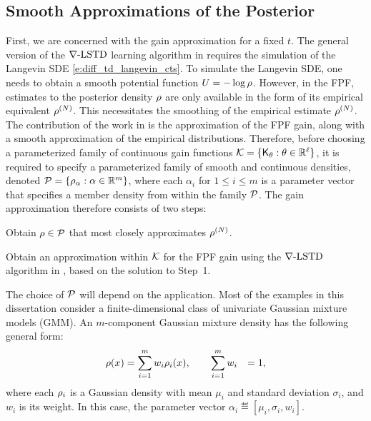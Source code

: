 \subsection{Smooth Approximations of the Posterior}
\label{s:fpf_em}
First, we are concerned with the gain approximation for a fixed $t$. The general version of the $\nabla\text{-LSTD}$ learning algorithm in  requires the simulation of the Langevin SDE \eqref{e:diff_td_langevin_cts}. To simulate the Langevin SDE, one needs to obtain a smooth potential function $U = -\log \rho$. However, in the FPF, estimates to the posterior density $\rho$ are only available in the form of its empirical equivalent $\rho^{(N)}$. This necessitates the smoothing of the empirical estimate $\rho^{(N)}$. The contribution of the work in \cite{raddevmey16} is the approximation of the FPF gain, along with a smooth approximation of the empirical distributions. Therefore, before choosing a parameterized family of continuous gain functions ${\cal K} = \{\text{\sf K}_\theta : \theta\in\mathbb{R}^{\ell}\}$, it is required to specify a parameterized family  of smooth and continuous densities, denoted  ${\cal P} = \{ \rho_\alpha : \alpha\in\mathbb{R}^m\}$, where each $\alpha_i$ for $1 \leq i \leq m$ is a parameter vector that specifies a member density from within the family ${\cal P}$.
The gain approximation therefore consists of two steps:
\begin{arabnum}
	\item Obtain $\rho\in{\cal P} $ that most closely approximates $\rho^{(N)}$.
	\item  Obtain an approximation within ${\cal K}$ for the FPF gain using the $\nabla\text{-LSTD}$ algorithm in , based on the solution to Step~1.
\end{arabnum}
The choice of ${\cal P}$ will depend on the application. Most of the examples in this dissertation consider a finite-dimensional class of univariate Gaussian mixture models (GMM). An $m$-component Gaussian mixture density has the following general form:
\begin{equation}
\begin{aligned}
\pr(x)& = \sum_{i=1}^{m} w_{i} \pr_{i}(x), \qquad  \sum_{i=1}^{m} w_{i} &=1 ,
\label{e:fpf_gaussian_mix}
\end{aligned}
\end{equation}
\noindent
where each $\rho_{i}$ is a Gaussian density with mean $\mu_{i}$ and standard deviation $\sigma_{i}$, and $w_i$ is its weight. In this case, the parameter vector $\alpha_i \eqdef [ \mu_i, \sigma_i, w_i]$. 
